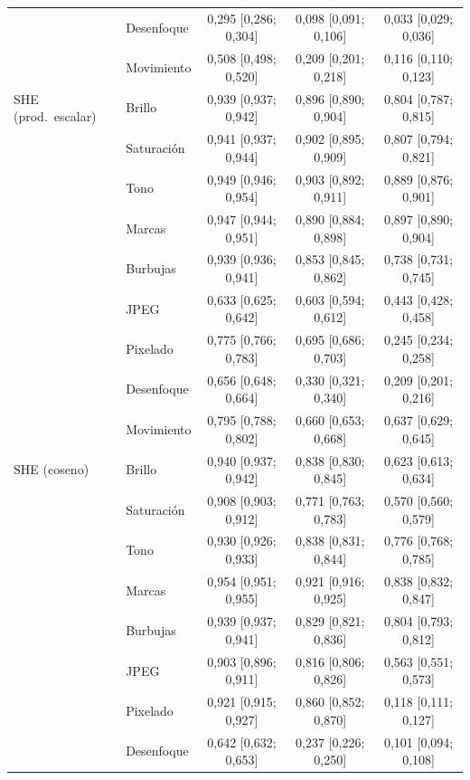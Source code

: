 {\begin{longtable}{llccc}
 & Desenfoque & 0{,}295 [0{,}286; 0{,}304] & 0{,}098 [0{,}091; 0{,}106] & 0{,}033 [0{,}029; 0{,}036] \\
 & Movimiento & 0{,}508 [0{,}498; 0{,}520] & 0{,}209 [0{,}201; 0{,}218] & 0{,}116 [0{,}110; 0{,}123] \\
\midrule
SHE (prod.\ escalar) & Brillo & 0{,}939 [0{,}937; 0{,}942] & 0{,}896 [0{,}890; 0{,}904] & 0{,}804 [0{,}787; 0{,}815] \\
 & Saturación & 0{,}941 [0{,}937; 0{,}944] & 0{,}902 [0{,}895; 0{,}909] & 0{,}807 [0{,}794; 0{,}821] \\
 & Tono & 0{,}949 [0{,}946; 0{,}954] & 0{,}903 [0{,}892; 0{,}911] & 0{,}889 [0{,}876; 0{,}901] \\
 & Marcas & 0{,}947 [0{,}944; 0{,}951] & 0{,}890 [0{,}884; 0{,}898] & 0{,}897 [0{,}890; 0{,}904] \\
 & Burbujas & 0{,}939 [0{,}936; 0{,}941] & 0{,}853 [0{,}845; 0{,}862] & 0{,}738 [0{,}731; 0{,}745] \\
 & JPEG & 0{,}633 [0{,}625; 0{,}642] & 0{,}603 [0{,}594; 0{,}612] & 0{,}443 [0{,}428; 0{,}458] \\
 & Pixelado & 0{,}775 [0{,}766; 0{,}783] & 0{,}695 [0{,}686; 0{,}703] & 0{,}245 [0{,}234; 0{,}258] \\
 & Desenfoque & 0{,}656 [0{,}648; 0{,}664] & 0{,}330 [0{,}321; 0{,}340] & 0{,}209 [0{,}201; 0{,}216] \\
 & Movimiento & 0{,}795 [0{,}788; 0{,}802] & 0{,}660 [0{,}653; 0{,}668] & 0{,}637 [0{,}629; 0{,}645] \\
\midrule
SHE (coseno) & Brillo & 0{,}940 [0{,}937; 0{,}942] & 0{,}838 [0{,}830; 0{,}845] & 0{,}623 [0{,}613; 0{,}634] \\
 & Saturación & 0{,}908 [0{,}903; 0{,}912] & 0{,}771 [0{,}763; 0{,}783] & 0{,}570 [0{,}560; 0{,}579] \\
 & Tono & 0{,}930 [0{,}926; 0{,}933] & 0{,}838 [0{,}831; 0{,}844] & 0{,}776 [0{,}768; 0{,}785] \\
 & Marcas & 0{,}954 [0{,}951; 0{,}955] & 0{,}921 [0{,}916; 0{,}925] & 0{,}838 [0{,}832; 0{,}847] \\
 & Burbujas & 0{,}939 [0{,}937; 0{,}941] & 0{,}829 [0{,}821; 0{,}836] & 0{,}804 [0{,}793; 0{,}812] \\
 & JPEG & 0{,}903 [0{,}896; 0{,}911] & 0{,}816 [0{,}806; 0{,}826] & 0{,}563 [0{,}551; 0{,}573] \\
 & Pixelado & 0{,}921 [0{,}915; 0{,}927] & 0{,}860 [0{,}852; 0{,}870] & 0{,}118 [0{,}111; 0{,}127] \\
 & Desenfoque & 0{,}642 [0{,}632; 0{,}653] & 0{,}237 [0{,}226; 0{,}250] & 0{,}101 [0{,}094; 0{,}108] \\

\end{longtable}}
